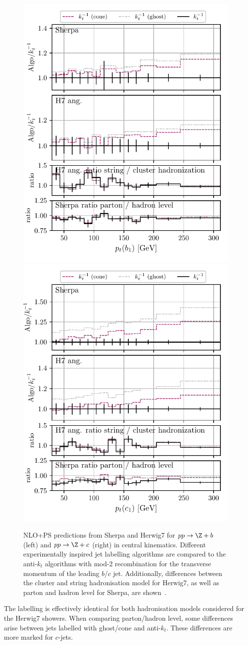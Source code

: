 \documentclass[10pt,a4paper]{book}
\begin{document}
\begin{figure}
    \centering
    \includegraphics[width=0.5\linewidth,page=3]{ftag/summary/ppzj_bottom_nlops_comparisons_exp.pdf}%
    \includegraphics[width=0.5\linewidth,page=3]{ftag/summary/ppzj_charm_nlops_comparisons_exp.pdf}
    \caption{NLO+PS predictions from Sherpa and Herwig7 for $pp \to \Z + b$ (left) and $pp \to \Z + c$ (right) in central kinematics. Different experimentally inspired jet labelling algorithms are compared to the anti-$k_t$ algorithms with mod-2 recombination for the transverse momentum of the leading $b$/$c$ jet. Additionally, differences between the cluster and string hadronisation model for Herwig7, as well as parton and hadron level for Sherpa, are shown~\cite{Behring:2025ilo}.}
    \label{fig:summary_ppzj_nlops_bottom_exp}
\end{figure}

The labelling is effectively identical for both hadronisation models considered for the Herwig7 showers. When comparing parton/hadron level, some differences arise between jets labelled with ghost/cone and anti-$k_t$. These differences are more marked for $c$-jets.
\end{document}
